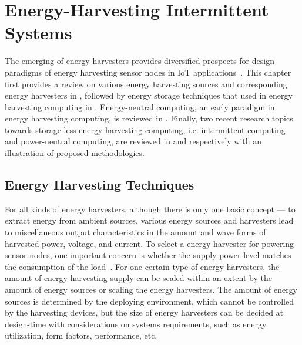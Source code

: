 \chapter{Energy-Harvesting Intermittent Systems} \label{chapter:review}

The emerging of energy harvesters provides diversified prospects for design paradigms of energy harvesting sensor nodes in IoT applications~\cite{miorandi2012internet}. This chapter first provides a review on various energy harvesting sources and corresponding energy harvesters in , followed by energy storage techniques that used in energy harvesting computing in . Energy-neutral computing, an early paradigm in energy harvesting computing, is reviewed in . Finally, two recent research topics towards storage-less energy harvesting computing, i.e. intermittent computing and power-neutral computing, are reviewed in  and  respectively with an illustration of proposed methodologies.

\section{Energy Harvesting Techniques} \label{Section:EH}

For all kinds of energy harvesters, although there is only one basic concept --- to extract energy from ambient sources, various energy sources and harvesters lead to miscellaneous output characteristics in the amount and wave forms of harvested power, voltage, and current. To select a energy harvester for powering sensor nodes, one important concern is whether the supply power level matches the consumption of the load~\cite{shaikh2016energy}. For one certain type of energy harvesters, the amount of energy harvesting supply can be scaled within an extent by the amount of energy sources or scaling the energy harvesters. The amount of energy sources is determined by the deploying environment, which cannot be controlled by the harvesting devices, but the size of energy harvesters can be decided at design-time with considerations on systems requirements, such as energy utilization, form factors, performance, etc. 

